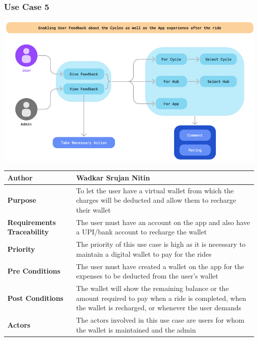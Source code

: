 \documentclass[11pt]{article}
\begin{document}
\subsubsection{Use Case 5}
\begin{center}
\includegraphics*[scale=0.6]{usecase-5.png}\\
\vspace{5mm}
\begin{tabular}{|l|p{10cm}|}
    \hline
    \textbf{Author} &  Wadkar Srujan Nitin\\
    \hline
    \textbf{Purpose} & To let the user have a virtual wallet from which the charges will be deducted and allow them to recharge their wallet \\
    \hline
    \textbf{Requirements Traceability} & The user must have an account on the app and also have a UPI/bank account to recharge the wallet\\
    \hline
    \textbf{Priority} & The priority of this use case is high as it is necessary to maintain a digital wallet to pay for the rides\\
    \hline
    \textbf{Pre Conditions} & The user must have created a wallet on the app for the expenses to be deducted from the user’s wallet\\
    \hline
    \textbf{Post Conditions} & The wallet will show the remaining balance or the amount required to pay when a ride is completed, when the wallet is recharged, or whenever the user demands\\
    \hline
    \textbf{Actors} & The actors involved in this use case are users for whom the wallet is maintained and the admin\\
    \hline
\end{tabular}
\end{center}
\end{document}
